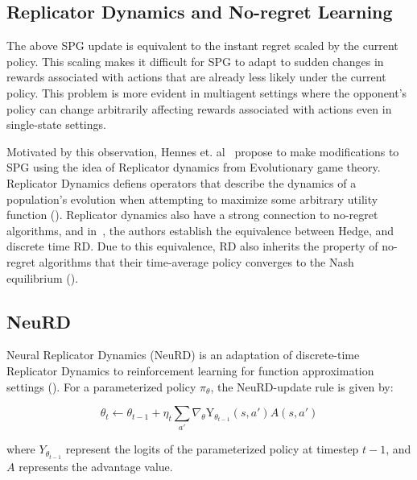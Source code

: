\subsection{Replicator Dynamics and No-regret Learning}
The above SPG update is equivalent to the instant regret scaled by the current policy.
This scaling makes it difficult for SPG to adapt to sudden changes in rewards associated with
actions that are already less likely under the current policy.
This problem is more evident in multiagent settings where the opponent's policy can change
arbitrarily affecting rewards associated with actions even in single-state settings.

Motivated by this observation, Hennes et.
al~\cite{hennesNeural2020} propose to make modifications
to SPG using the idea of Replicator dynamics from Evolutionary game theory.
Replicator Dynamics defiens operators that describe the dynamics of a population's evolution when
attempting to maximize some arbitrary utility function ().
Replicator dynamics also have a strong connection to no-regret algorithms, and
in~\cite[Statement~1]{hennesNeural2020}, the authors establish the equivalence between Hedge, and
discrete time RD.
Due to this equivalence, RD also inherits the property of no-regret algorithms that their
time-average policy converges to the Nash equilibrium ().

\subsection{NeuRD}
Neural Replicator Dynamics (NeuRD) is an adaptation of discrete-time Replicator Dynamics to
reinforcement learning for function approximation settings ().
For a parameterized policy $\pi_\theta$, the NeuRD-update rule is given by:

\begin{equation}
	\label{eqn:nrd} \theta_t \leftarrow \theta_{t-1} + \eta_t \sum_{a'}
	\nabla_{\theta} \text{Y}_{\theta_{t-1}}(s, a') A(s, a')
\end{equation}

where
$Y_{\theta_{t-1}}$ represent the logits of the parameterized policy at timestep $t-1$, and $A$
represents the advantage value.

